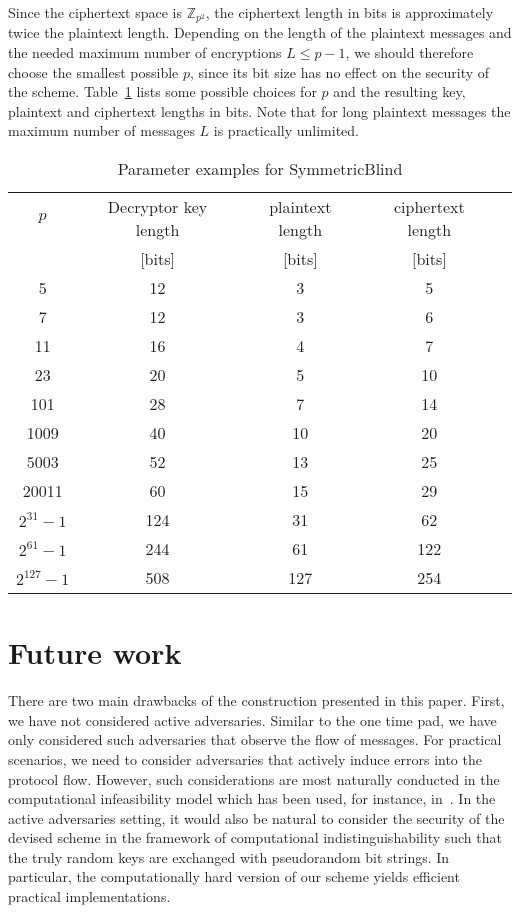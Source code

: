 \documentclass[10pt,journal]{IEEEtran}
\newcommand{\Z}{\mathbb{Z}}
\begin{document}
Since the ciphertext space is $\Z_{p^2}$,
the ciphertext length in bits is approximately twice the plaintext length.
Depending on the length of the plaintext messages and the needed maximum number of encryptions $L \leq p-1$, we should therefore
choose the smallest possible $p$, since its bit size has no effect on the security of the scheme. Table~\ref{tab:Various parameter examples}
lists some possible choices for $p$ and the resulting key, plaintext and ciphertext lengths in bits. Note that
for long plaintext messages the maximum number of messages $L$ is practically unlimited.
\begin{table}\caption{Parameter examples for SymmetricBlind}
\begin{tabular}{ccccc}
$p$ & Decryptor key length & plaintext length & ciphertext length\\
& [bits] & [bits] & [bits]\\
\hline
5 & 12 & 3 & 5\\
7 & 12 & 3 & 6\\
11 & 16 & 4 & 7\\
23 & 20 & 5 & 10\\
101 & 28 & 7 & 14\\
1009 & 40 & 10 & 20\\
5003 & 52 & 13 & 25\\
20011 & 60 & 15 & 29\\
$2^{31} - 1$ & 124 & 31 & 62\\
$2^{61} - 1$ & 244 & 61 & 122\\
$2^{127} - 1$ & 508 & 127 & 254\\
\end{tabular}
\vspace{4pt}
\label{tab:Various parameter examples}
\end{table}






\section{Future work}
\label{sec:Future work}

There are two main drawbacks of the construction presented in this paper.
First, we have not considered active adversaries. Similar to the one time pad, we have only considered
such adversaries that observe the flow of messages. For practical scenarios, we need to consider
adversaries that actively induce errors into the protocol flow. However, such considerations
are most naturally conducted in the computational infeasibility model which has been used, for instance, in~\cite{Green_2011}.
In the active adversaries setting, it would also be
natural to consider the security of the devised scheme in the framework of computational indistinguishability such that
the truly random keys are exchanged with pseudorandom bit strings. In particular, the computationally hard version of
our scheme yields efficient practical implementations.
\end{document}
